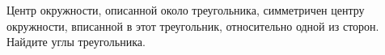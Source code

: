 \begin{ex}
	\begin{condition}
		Центр окружности, описанной около треугольника,	симметричен центру окружности, вписанной в этот треугольник, относительно одной из сторон. Найдите углы треугольника.
	\end{condition}
\end{ex}